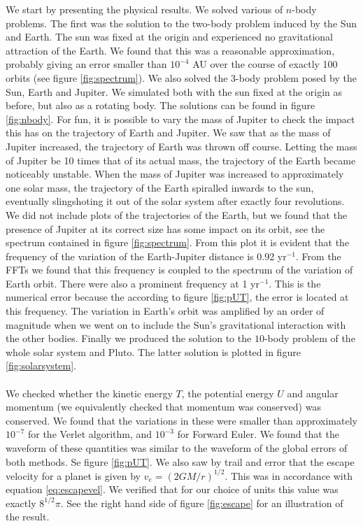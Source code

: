 \documentclass[11pt,english,a4paper]{article}
\begin{document}
We start by presenting the physical results. We solved various of $n$-body problems. The first was the solution to the two-body problem induced by the Sun and Earth. The sun was fixed at the origin and experienced no gravitational attraction of the Earth. We found that this was a reasonable approximation, probably giving an error smaller than $10^{-4}$ AU over the course of exactly 100 orbits (see figure \ref{fig:spectrum}). We also solved the 3-body problem posed by the Sun, Earth and Jupiter. We simulated both with the sun fixed at the origin as before, but also as a rotating body. The solutions can be found in figure \ref{fig:nbody}. For fun, it is possible to vary the mass of Jupiter to check the impact this has on the trajectory of Earth and Jupiter. We saw that as the mass of Jupiter increased, the trajectory of Earth was thrown off course. Letting the mass of Jupiter be 10 times that of its actual mass, the trajectory of the Earth became noticeably unstable. When the mass of Jupiter was increased to approximately one solar mass, the trajectory of the Earth spiralled inwards to the sun, eventually slingshoting it out of the solar system after exactly four revolutions. We did not include plots of the trajectories of the Earth, but we found that the presence of Jupiter at its correct size has some impact on its orbit, see the spectrum contained in figure \ref{fig:spectrum}. From this plot it is evident that the frequency of the variation of the Earth-Jupiter distance is 0.92 yr$^{-1}$. From the FFTs we found that this frequency is coupled to the spectrum of the variation of Earth orbit. There were also a prominent frequency at 1 yr$^{-1}$. This is the numerical error because the according to figure \ref{fig:pUT}, the error is located at this frequency. The variation in Earth's orbit was amplified by an order of magnitude when we went on to include the Sun's gravitational interaction with the other bodies. Finally we produced the solution to the $10$-body problem of the whole solar system and Pluto. The latter solution is plotted in figure \ref{fig:solarsystem}. \\
\\
We checked whether the kinetic energy $T$, the potential energy $U$ and angular momentum (we equivalently checked that momentum was conserved) was conserved. We found that the variations in these were smaller than approximately $10^{-7}$ for the Verlet algorithm, and $10^{-3}$ for Forward Euler. We found that the waveform of these quantities was similar to the waveform of the global errors of both methods. Se figure \ref{fig:pUT}. We also saw by trail and error that the escape velocity for a planet is given by $v_e = (2GM/r)^{1/2}$. This was in accordance with equation \eqref{eq:escapevel}. We verified that for our choice of units this value was exactly $8^{1/2}\pi$. See the right hand side of figure \ref{fig:escape} for an illustration of the result.\\
\end{document}
